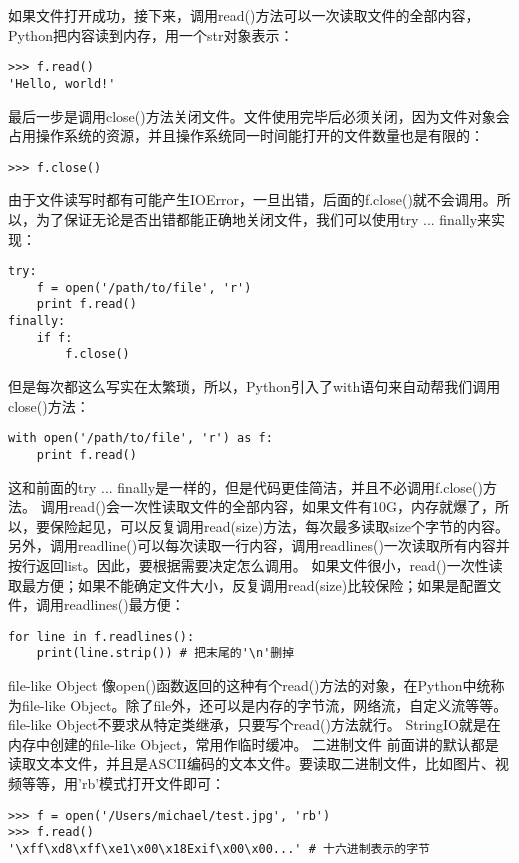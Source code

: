 \documentclass[twoside,11pt]{book}
\begin{document}
如果文件打开成功，接下来，调用read()方法可以一次读取文件的全部内容，Python把内容读到内存，用一个str对象表示：
\begin{lstlisting}
>>> f.read()
'Hello, world!'
\end{lstlisting}

最后一步是调用close()方法关闭文件。文件使用完毕后必须关闭，因为文件对象会占用操作系统的资源，并且操作系统同一时间能打开的文件数量也是有限的：
\begin{lstlisting}
>>> f.close()
\end{lstlisting}

由于文件读写时都有可能产生IOError，一旦出错，后面的f.close()就不会调用。所以，为了保证无论是否出错都能正确地关闭文件，我们可以使用try ... finally来实现：
\begin{lstlisting}
try:
    f = open('/path/to/file', 'r')
    print f.read()
finally:
    if f:
        f.close()
\end{lstlisting}

但是每次都这么写实在太繁琐，所以，Python引入了with语句来自动帮我们调用close()方法：
\begin{lstlisting}
with open('/path/to/file', 'r') as f:
    print f.read()
\end{lstlisting}

这和前面的try ... finally是一样的，但是代码更佳简洁，并且不必调用f.close()方法。
调用read()会一次性读取文件的全部内容，如果文件有10G，内存就爆了，所以，要保险起见，可以反复调用read(size)方法，每次最多读取size个字节的内容。另外，调用readline()可以每次读取一行内容，调用readlines()一次读取所有内容并按行返回list。因此，要根据需要决定怎么调用。
如果文件很小，read()一次性读取最方便；如果不能确定文件大小，反复调用read(size)比较保险；如果是配置文件，调用readlines()最方便：
\begin{lstlisting}
for line in f.readlines():
    print(line.strip()) # 把末尾的'\n'删掉
\end{lstlisting}

file-like Object
像open()函数返回的这种有个read()方法的对象，在Python中统称为file-like Object。除了file外，还可以是内存的字节流，网络流，自定义流等等。file-like Object不要求从特定类继承，只要写个read()方法就行。
StringIO就是在内存中创建的file-like Object，常用作临时缓冲。
二进制文件
前面讲的默认都是读取文本文件，并且是ASCII编码的文本文件。要读取二进制文件，比如图片、视频等等，用'rb'模式打开文件即可：
\begin{lstlisting}
>>> f = open('/Users/michael/test.jpg', 'rb')
>>> f.read()
'\xff\xd8\xff\xe1\x00\x18Exif\x00\x00...' # 十六进制表示的字节
\end{lstlisting}
\end{document}
